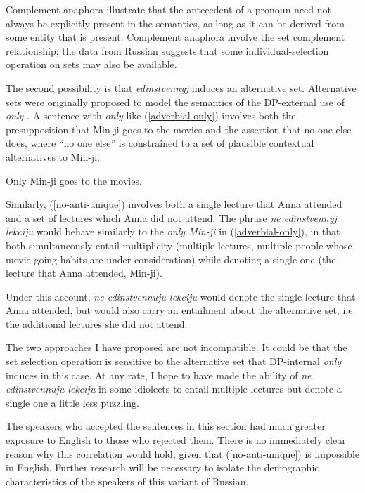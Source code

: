 Complement anaphora illustrate that the antecedent of a pronoun need not always be explicitly present in the semantics, as long as it can be derived from some entity that is present. Complement anaphora involve the set complement relationship; the data from Russian suggests that some individual-selection operation on sets may also be available.

The second possibility is that \textit{edinstvennyj} induces an alternative set. Alternative sets were originally proposed to model the semantics of the DP-external use of \textit{only} \citep{rooth85, rooth92}.
A sentence with \textit{only} like (\ref{adverbial-only}) involves both the presupposition that Min-ji goes to the movies and the assertion that no one else does, where ``no one else'' is constrained to a set of plausible contextual alternatives to Min-ji.

\begin{exe}
	\ex \label{adverbial-only} Only Min-ji goes to the movies.
\end{exe}

Similarly, (\ref{no-anti-unique}) involves both a single lecture that Anna attended and a set of lectures which Anna did not attend. The phrase \textit{ne edinstvennyj lekciju} would behave similarly to the \textit{only Min-ji} in (\ref{adverbial-only}), in that both simultaneously entail multiplicity (multiple lectures, multiple people whose movie-going habits are under consideration) while denoting a single one (the lecture that Anna attended, Min-ji).

Under this account, \textit{ne edinstvennuju lekciju} would denote the single lecture that Anna attended, but would also carry an entailment about the alternative set, i.e. the additional lectures she did not attend.

The two approaches I have proposed are not incompatible. It could be that the set selection operation is sensitive to the alternative set that DP-internal \textit{only} induces in this case. At any rate, I hope to have made the ability of \textit{ne edinstvennuju lekciju} in some idiolects to entail multiple lectures but denote a single one a little less puzzling.

The speakers who accepted the sentences in this section had much greater exposure to English to those who rejected them. There is no immediately clear reason why this correlation would hold, given that (\ref{no-anti-unique}) is impossible in English. Further research will be necessary to isolate the demographic characteristics of the speakers of this variant of Russian.


